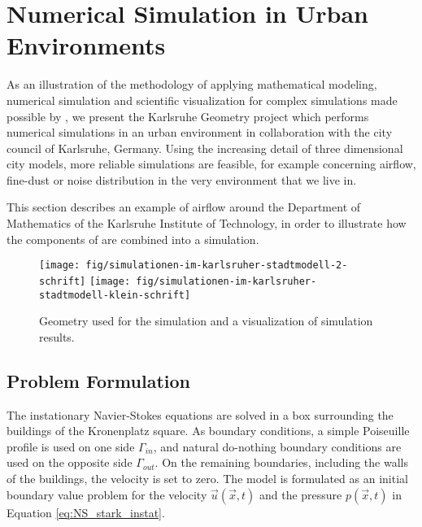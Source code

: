 \section{Numerical Simulation in Urban Environments}
As an illustration of the methodology of applying mathematical modeling,
numerical simulation and scientific visualization for complex simulations
made possible by \hiflow{}, we present the Karlsruhe Geometry project
which performs numerical simulations in an urban environment in
collaboration with the city council of Karlsruhe, Germany.  Using the increasing
detail of three dimensional city models, more reliable simulations are
feasible, for example concerning airflow, fine-dust or noise distribution
in the very environment that we live in.

This section describes an example of airflow around the
Department of Mathematics of the Karlsruhe Institute of
Technology, in order to illustrate how the components
of \hiflow{} are combined into a simulation.

\begin{figure}[ht]
  \centering
  \texttt{[image: fig/simulationen-im-karlsruher-stadtmodell-2-schrift]}
  \texttt{[image: fig/simulationen-im-karlsruher-stadtmodell-klein-schrift]}
  \caption{Geometry used for the simulation and a visualization of simulation results.}
  \label{fig:KarlsruheGeometry}
\end{figure}

\subsection{Problem Formulation}
The instationary Navier-Stokes equations are solved in a box
surrounding the buildings of the Kronenplatz square. As boundary
conditions, a simple Poiseuille profile is used on one side
$\Gamma_{in}$, and natural do-nothing boundary conditions are used on
the opposite side $\Gamma_{out}$. On the remaining boundaries,
including the walls of the buildings, the velocity is set to zero. The
model is formulated as an initial boundary value problem for the
velocity $\vec{u}\left(\vec{x}, t\right)$ and the pressure
$p\left(\vec{x}, t\right)$ in Equation \ref{eq:NS_stark_instat}.

